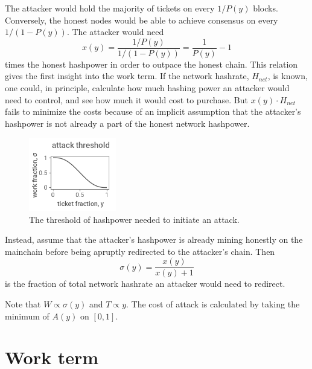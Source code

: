 \documentclass[a4paper,12pt]{article}
\begin{document}
The attacker would hold the majority of tickets on every $ 1 / P(y) $ blocks. Conversely, the honest nodes would be able to achieve consensus on every $ 1 / (1 - P(y)) $. The attacker would need 
%
\begin{equation}
x(y) = \frac{ 1 / P(y) }{ 1 / ( 1 - P(y) ) } = \frac{ 1 }{ P(y) } - 1
\end{equation}
%
times the honest hashpower in order to outpace the honest chain. This relation gives the first insight into the work term. If the network hashrate,  $ H_{net} $, is known, one could, in principle, calculate how much hashing power an attacker would need to control, and see how much it would cost to purchase. But $ x(y) \cdot H_{net} $ fails to minimize the costs because of an implicit assumption that the attacker's hashpower is not already a part of the honest network hashpower. 
%
\begin{figure}
  \vspace{-10pt}
  \begin{center}
    	\includegraphics[width=0.34\textwidth]{sigma}
	\vspace{-10pt}
	\begin{minipage}[t]{0.35\textwidth}
	\caption{The threshold of hashpower needed to initiate an attack. }	
	\end{minipage}
	\vspace{0pt}
  \end{center}
\end{figure}
%
Instead, assume that the attacker's hashpower is already mining honestly on the mainchain before being apruptly redirected to the attacker's chain. Then
%
\begin{equation}
\sigma(y) = \frac{ x(y) }{ x(y) + 1 }
\end{equation}
%
is the fraction of total network hashrate an attacker would need to redirect. 

Note that $ W \propto \sigma(y) $ and $ T \propto y $. The cost of attack is calculated by taking the minimum of $ A(y) $ on $[0,1]$. 

\section{Work term}
\end{document}
